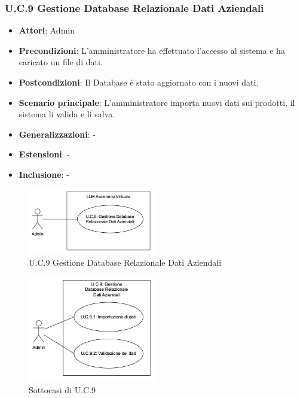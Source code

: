 \subsubsection{U.C.9 Gestione Database Relazionale Dati Aziendali}
\begin{itemize}
    \item \textbf{Attori}: Admin
    \item \textbf{Precondizioni}: L’amministratore ha effettuato l’accesso al sistema e ha caricato un file di dati.
    \item \textbf{Postcondizioni}: Il Database è stato aggiornato con i nuovi dati.
    \item \textbf{Scenario principale}: L’amministratore importa nuovi dati sui prodotti, il sistema li valida e li salva.
    \item \textbf{Generalizzazioni}: -
    \item \textbf{Estensioni}: -
    \item \textbf{Inclusione}: -
\end{itemize}
\begin{figure}[h!]
    \centering
    \includegraphics[width=0.5\textwidth]{img/UC9.png}
    \caption{U.C.9 Gestione Database Relazionale Dati Aziendali}
\end{figure}
\begin{figure}[h!]
    \centering
    \includegraphics[width=0.5\textwidth]{img/UC9p1.png}
    \caption{Sottocasi di U.C.9}
\end{figure}
